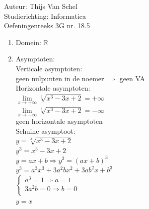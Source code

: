 \documentclass[a4paper]{article}
\begin{document}
  
\noindent \large Auteur: Thijs Van Schel \\
\noindent \large Studierichting: Informatica\\
\noindent \large Oefeningenreeks 3G nr. 18.5\\

\medskip

\normalsize

\begin{enumerate}
    \item Domein: $\mathbb{R}$\\

    \item Asymptoten:\\
    
    Verticale asymptoten:\\
    
    geen nulpunten in de noemer $\Rightarrow$ geen VA\\
    
    Horizontale asymptoten:\\
    
    $\lim\limits_{x \to +\infty} \sqrt[3]{x^3-3x+2} = +\infty$\\
    
    $\lim\limits_{x \to -\infty} \sqrt[3]{x^3-3x+2} = -\infty$\\
    
    geen horizontale asymptoten\\
    
    Schuine asymptoot:\\
    
    $y = \sqrt[3]{x^3-3x+2}$\\
    
    $y^3 = x^3 - 3x + 2$\\
    
    $y = ax + b \Rightarrow y^3 = (ax+b)^3$\\
    
    $y^3 = a^3x^3 + 3a^2bx^2 + 3ab^2x + b^3$\\
    
    $\left\{
        \begin{array}{l}
            a^3 = 1 \Rightarrow a = 1\\
            3a^2b = 0 \Rightarrow b = 0\\
        \end{array}
    \right.$\\
    
    $y = x$\\
    

\end{enumerate}
\end{document}
